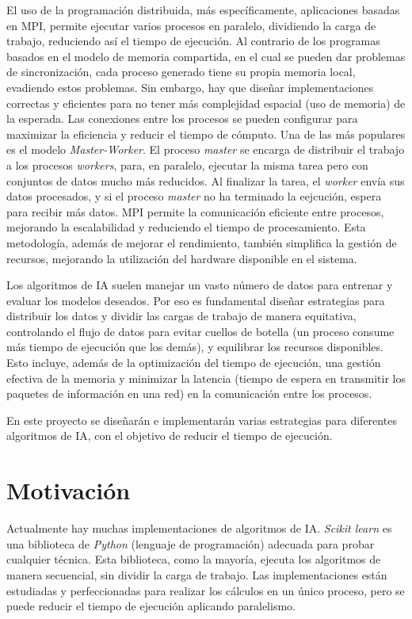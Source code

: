 	El uso de la programación distribuida, más específicamente, aplicaciones basadas en MPI, permite ejecutar varios procesos en paralelo, dividiendo la carga de trabajo, reduciendo así el tiempo de ejecución. Al contrario de los programas basados en el modelo de memoria compartida, en el cual se pueden dar problemas de sincronización, cada proceso generado tiene su propia memoria local, evadiendo estos problemas. Sin embargo, hay que diseñar implementaciones correctas y eficientes para no tener más complejidad espacial (uso de memoria) de la esperada. Las conexiones entre los procesos se pueden configurar para maximizar la eficiencia y reducir el tiempo de cómputo. Una de las más populares es el modelo \textit{Master-Worker}. El proceso \textit{master} se encarga de distribuir el trabajo a los procesos \textit{workers}, para, en paralelo, ejecutar la misma tarea pero con conjuntos de datos mucho más reducidos. Al finalizar la tarea, el \textit{worker} envía sus datos procesados, y si el proceso \textit{master} no ha terminado la eejcución, espera para recibir más datos. MPI permite la comunicación eficiente entre procesos, mejorando la escalabilidad y reduciendo el tiempo de procesamiento. Esta metodología, además de mejorar el rendimiento, también simplifica la gestión de recursos, mejorando la utilización del hardware disponible en el sistema. 
	
	Los algoritmos de IA suelen manejar un vasto número de datos para entrenar y evaluar los modelos deseados. Por eso es fundamental diseñar estrategias para distribuir los datos y dividir las cargas de trabajo de manera equitativa, controlando el flujo de datos para evitar cuellos de botella (un proceso consume más tiempo de ejecución que los demás), y equilibrar los recursos disponibles. Esto incluye, además de la optimización del tiempo de ejecución, una gestión efectiva de la memoria y minimizar la latencia (tiempo de espera en transmitir los paquetes de información en una red) en la comunicación entre los procesos. 
	
	En este proyecto se diseñarán e implementarán varias estrategias para diferentes algoritmos de IA, con el objetivo de reducir el tiempo de ejecución.





\section{Motivación}
	Actualmente hay muchas implementaciones de algoritmos de IA. \textit{Scikit learn} es una biblioteca de \textit{Python} (lenguaje de programación) adecuada para probar cualquier técnica. Esta biblioteca, como la mayoría, ejecuta los algoritmos de manera secuencial, sin dividir la carga de trabajo. Las implementaciones están estudiadas y perfeccionadas para realizar los cálculos en un único proceso, pero se puede reducir el tiempo de ejecución aplicando paralelismo. 
	

